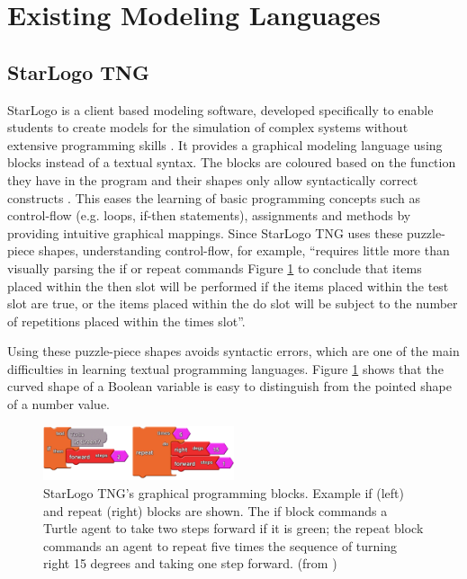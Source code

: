\documentclass[runningheads,a4paper]{llncs}
\begin{document}
 \section{Existing Modeling Languages}
 
 \subsection{StarLogo TNG}
  StarLogo is a client based modeling software, developed specifically to enable students to 
  create models for the simulation of complex systems without extensive programming skills \cite{klopfer2009starlogo}.
  It provides a graphical modeling language using blocks instead of a textual syntax. 
  The blocks are coloured based on the function they have in the program and their shapes only allow syntactically correct constructs \cite{klopfer2009starlogo}.
  This eases the learning of basic programming concepts such as control-flow (e.g. loops, if-then statements),
  assignments and methods by providing intuitive graphical mappings. Since StarLogo TNG uses these puzzle-piece shapes, understanding 
  control-flow, for example, ``requires little more than visually parsing the if or repeat commands 
  Figure \ref{fig1} to conclude that items placed within the then slot will be performed if the items placed within the 
  test slot are true, or the items placed within the do slot will be subject to the number of repetitions placed within the times slot''\cite{smith2011biology}.
  
  Using these puzzle-piece shapes avoids syntactic errors, which are one of the main difficulties in learning textual programming languages.
  Figure \ref{fig1} shows that the curved shape of a Boolean variable is easy to distinguish from the pointed shape of a number value.
  
  \begin{figure}[H]
	\centering
  \includegraphics[width=0.5\textwidth]{images/StarLogoTNGBlocksEx.PNG}
	\caption{ StarLogo TNG’s graphical programming blocks. Example if (left) and repeat (right) blocks are shown. The
	  if block commands a Turtle agent to take two steps forward if it is green; the repeat block commands an agent to
	  repeat five times the sequence of turning right 15 degrees and taking one step forward. (from \cite{smith2011biology})}
	\label{fig1}
  \end{figure}
  
\end{document}
